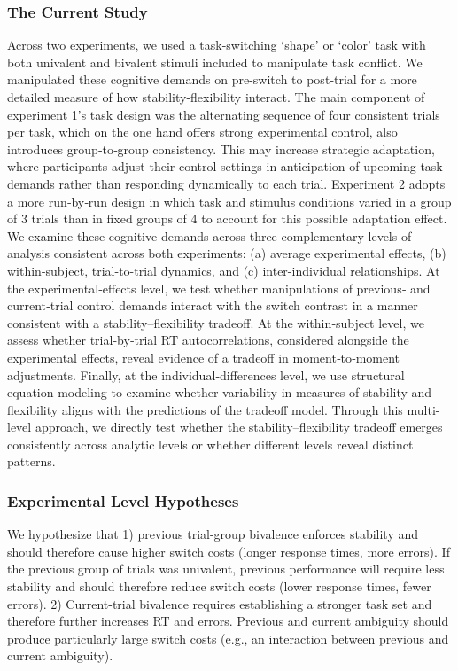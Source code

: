 \documentclass[
  english,
  man,floatsintext]{apa6}
\begin{document}
\subsubsection{The Current Study}\label{the-current-study}

Across two experiments, we used a task-switching `shape' or `color' task with both univalent and bivalent stimuli included to manipulate task conflict. We manipulated these cognitive demands on pre-switch to post‑trial for a more detailed measure of how stability-flexibility interact. The main component of experiment 1's task design was the alternating sequence of four consistent trials per task, which on the one hand offers strong experimental control, also introduces group‑to‑group consistency. This may increase strategic adaptation, where participants adjust their control settings in anticipation of upcoming task demands rather than responding dynamically to each trial. Experiment 2 adopts a more run‑by‑run design in which task and stimulus conditions varied in a group of 3 trials than in fixed groups of 4 to account for this possible adaptation effect.
We examine these cognitive demands across three complementary levels of analysis consistent across both experiments: (a) average experimental effects, (b) within-subject, trial-to-trial dynamics, and (c) inter-individual relationships. At the experimental‑effects level, we test whether manipulations of previous‑ and current‑trial control demands interact with the switch contrast in a manner consistent with a stability--flexibility tradeoff. At the within‑subject level, we assess whether trial‑by‑trial RT autocorrelations, considered alongside the experimental effects, reveal evidence of a tradeoff in moment‑to‑moment adjustments. Finally, at the individual‑differences level, we use structural equation modeling to examine whether variability in measures of stability and flexibility aligns with the predictions of the tradeoff model. Through this multi-level approach, we directly test whether the stability--flexibility tradeoff emerges consistently across analytic levels or whether different levels reveal distinct patterns.

\subsubsection{Experimental Level Hypotheses}\label{experimental-level-hypotheses}

We hypothesize that 1) previous trial-group bivalence enforces stability and should therefore cause higher switch costs (longer response times, more errors). If the previous group of trials was univalent, previous performance will require less stability and should therefore reduce switch costs (lower response times, fewer errors). 2) Current-trial bivalence requires establishing a stronger task set and therefore further increases RT and errors. Previous and current ambiguity should produce particularly large switch costs (e.g., an interaction between previous and current ambiguity).
\end{document}
